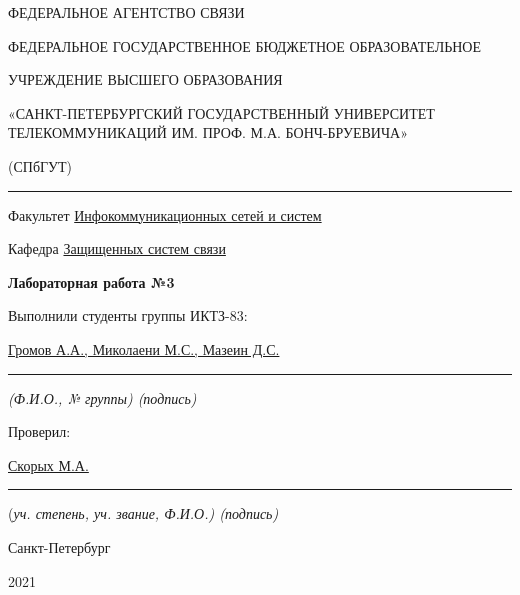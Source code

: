 \documentclass[a4paper,14pt]{extarticle}
\begin{document}
    \begin{center}
        \thispagestyle{empty}
        \begin{singlespace}
        ФЕДЕРАЛЬНОЕ АГЕНТСТВО СВЯЗИ

        ФЕДЕРАЛЬНОЕ ГОСУДАРСТВЕННОЕ БЮДЖЕТНОЕ ОБРАЗОВАТЕЛЬНОЕ

        УЧРЕЖДЕНИЕ ВЫСШЕГО ОБРАЗОВАНИЯ

        «САНКТ-ПЕТЕРБУРГСКИЙ ГОСУДАРСТВЕННЫЙ УНИВЕРСИТЕТ ТЕЛЕКОММУНИКАЦИЙ ИМ. ПРОФ. М.А. БОНЧ-БРУЕВИЧА»

        (СПбГУТ)
        \end{singlespace}
        \vspace{-1ex}
        \rule{\textwidth}{0.4pt}
        \vspace{-5ex}

        Факультет \underline{Инфокоммуникационных сетей и систем}

        Кафедра \underline{Защищенных систем связи}
        \vspace{10ex}

        \textbf{Лабораторная работа №3}\\
        


    \end{center}
    \vspace{4ex}
    \begin{flushright}
    \parbox{10 cm}{
    \begin{flushleft}
        Выполнили студенты группы ИКТЗ-83:

        \underline{Громов А.А., Миколаени М.С., Мазеин Д.С.} \hfill \rule[-0.85ex]{0.1\textwidth}{0.6pt}

        \footnotesize \textit{ (Ф.И.О., № группы) \hfill (подпись)} \normalsize

        Проверил:

        \underline{Скорых М.А.} \hfill \rule[-0.85ex]{0.1\textwidth}{0.6pt}

        (\footnotesize \textit{уч. степень, уч. звание, Ф.И.О.) \hfill (подпись)} \normalsize

    \end{flushleft}
    }
    \end{flushright}
    \begin{center}
        \vfill
        Санкт-Петербург

        2021

    \end{center}
    \newpage
\end{document}
